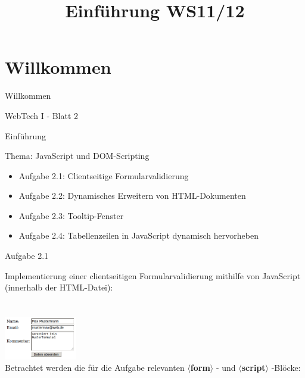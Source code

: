 \documentclass{beamer}
\title{Einführung WS11/12}
\begin{document}
\section{Willkommen}
\begin{frame}{Willkommen}
\begin{center}
\huge
WebTech I - Blatt 2
\vspace{7mm}

\end{center}
\end{frame}

\begin{frame}{Einführung}
\begin{center}Thema: JavaScript und DOM-Scripting\end{center}
\begin{itemize}
\item Aufgabe 2.1: Clientseitige Formularvalidierung
\item Aufgabe 2.2: Dynamisches Erweitern von HTML-Dokumenten
\item Aufgabe 2.3: Tooltip-Fenster
\item Aufgabe 2.4: Tabellenzeilen in JavaScript dynamisch hervorheben
\end{itemize}
\end{frame}

\begin{frame}{Aufgabe 2.1}
\begin{center}
Implementierung einer clientseitigen Formularvalidierung mithilfe von JavaScript (innerhalb der HTML-Datei):\\
~\\~\\
\includegraphics[width = 120px]{A1/src/formvali.png}
\\
Betrachtet werden die für die Aufgabe relevanten $\langle${\bf form}$\rangle$ - und $\langle${\bf script}$\rangle$ -Blöcke:
\end{center}
\end{frame}
\end{document}
